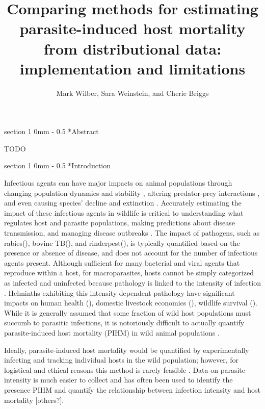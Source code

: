 \documentclass[12pt, a4paper]{article}
\title{Comparing methods for estimating parasite-induced host mortality from distributional data: implementation and limitations}
\author{Mark Wilber, Sara Weinstein, and Cherie Briggs}
\makeatletter
\renewcommand{\section}{\@startsection
{section}%
{1}%
{0mm}%
{-\baselineskip}%
{0.5\baselineskip}%
{\normalfont\bf\large}} %
\makeatother
\begin{document}
\maketitle

\section*{Abstract}

TODO

\doublespacing

\linenumbers
\section*{Introduction}

Infectious agents can have major impacts on animal populations through changing
population dynamics and stability \citep{Dobson1992}, altering predator-prey interactions \citep{Joly2004}, and
even causing species' decline and extinction \citep{DeCastro2005a,McCallum2012b}. Accurately estimating the impact
of these infectious agents in wildlife is critical to understanding what
regulates host and parasite populations, making predictions about disease
transmission, and managing disease outbreaks \citep{Langwig2015}. The impact of pathogens, such as rabies(), bovine TB(), and
rinderpest(),  is typically quantified based on the presence or absence of
disease, and does not account for the number of infectious agents present.
Although sufficient for many bacterial and viral agents that reproduce within a
host, for macroparasites, hosts cannot be simply categorized as infected and
uninfected because pathology is linked to the intensity of infection \citep{AndersonandMay1979}.  Helminths exhibiting this intensity dependent pathology have
significant impacts on human health (), domestic livestock economics (),
wildlife survival ().  While it is generally assumed that some fraction of
wild host populations must succumb to parasitic infections, it is notoriously
difficult to actually quantify parasite-induced host mortality (PIHM) in wild
animal populations \citep{Lafferty2002, McCallum2000a}.

Ideally, parasite-induced host mortality would be
quantified by experimentally infecting and tracking individual hosts in the
wild population; however, for logistical and ethical reasons this method is
rarely feasible \citep{McCallum2000a}. Data on parasite intensity is much easier to collect and has
often been used to identify the presence PIHM \citep{Crofton1971a,Lester1977,Lester1984,Lanciani1989,Royce1990,Ferguson2011} and quantify the
relationship between infection intensity and host mortality \citep{Adjei1986} [others?].
\end{document}

